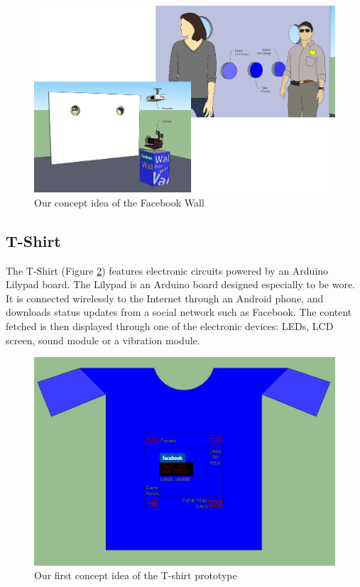 \begin{figure}[h!]
\centering \includegraphics[scale=0.22]{img/prestudies-facebookwall}
\caption{Our concept idea of the Facebook Wall}
\label{fig:prestudies-facebookwall}
\end{figure}

\newpage

\subsection{T-Shirt}
The T-Shirt (Figure \ref{fig:prestudies-tshirt})  features electronic circuits powered by an Arduino Lilypad board.
The Lilypad is an Arduino board designed especially to be wore. It is connected wirelessly to the Internet through
an Android phone, and downloads status updates from a social network such as Facebook.
The content fetched is then displayed through one of the electronic devices: LEDs, LCD screen,
sound module or a vibration module.


\begin{figure}[h!]
\centering \includegraphics[scale=0.35]{img/prestudies-tshirt}
\caption{Our first concept idea of the T-shirt prototype}
\label{fig:prestudies-tshirt}
\end{figure}

